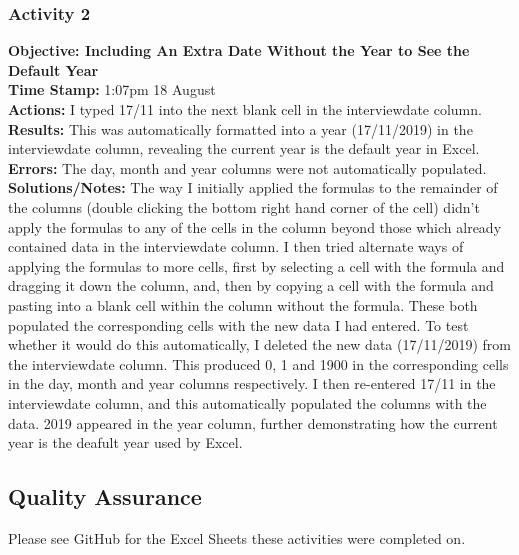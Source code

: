 \documentclass{article}
\begin{document}
\begin{FlushLeft}
\subsubsection*{Activity 2}\label{sec:formulacolumn}
\textbf{Objective: Including An Extra Date Without the Year to See the Default Year}\\
\textbf{Time Stamp:} 1:07pm 18 August\\
\textbf{Actions:} I typed 17/11 into the next blank cell in the interview\textunderscore date column.
\textbf{Results:} This was automatically formatted into a year (17/11/2019) in the interview\textunderscore date column, revealing the current year is the default year in Excel.\\
\textbf{Errors:} The day, month and year columns were not automatically populated.\\
\textbf{Solutions/Notes:} The way I initially applied the formulas to the remainder of the columns (double clicking the bottom right hand corner of the cell) didn't apply the formulas to any of the cells in the column beyond those which already contained data in the interview\textunderscore date column. I then tried alternate ways of applying the formulas to more cells, first by selecting a cell with the formula and dragging it down the column, and, then by copying a cell with the formula and pasting into a blank cell within the column without the formula. These both populated the corresponding cells with the new data I had entered. To test whether it would do this automatically, I deleted the new data (17/11/2019) from the interview\textunderscore date column. This produced 0, 1 and 1900 in the corresponding cells in the day, month and year columns respectively. I then re-entered 17/11 in the interview\textunderscore date column, and this automatically populated the columns with the data. 2019 appeared in the year column, further demonstrating how the current year is the deafult year used by Excel.\\

\subsection{Quality Assurance}
Please see GitHub for the Excel Sheets these activities were completed on.

\end{FlushLeft}
\end{document}
